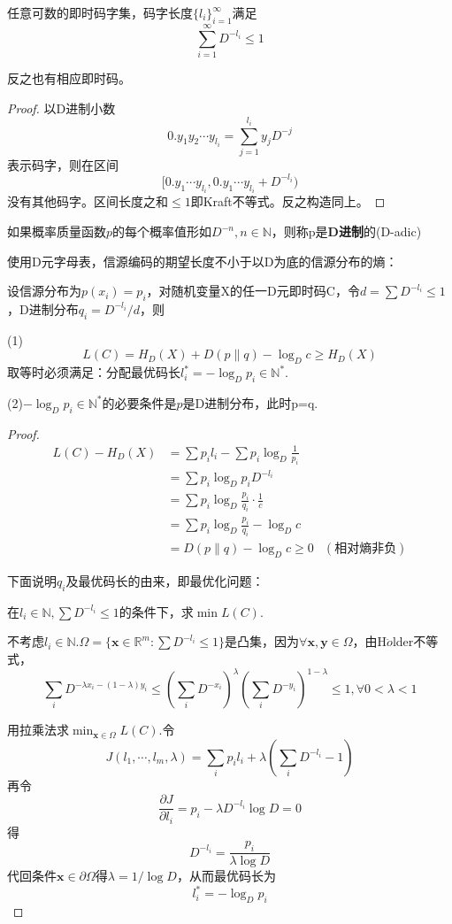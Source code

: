 \documentclass{ctexbook}
\begin{document}
\begin{theorem}[推广的Kraft不等式]
    任意可数的即时码字集，码字长度$\{l_i\}_{i=1}^{\infty}$满足
    \[\sum_{i=1}^{\infty}D^{-l_i}\leq 1\]

    反之也有相应即时码。
\end{theorem}
\begin{proof}
    以D进制小数
    \[0.y_1 y_2 \cdots y_{l_i}=\sum_{j=1}^{l_i}y_j D^{-j}\]
    表示码字，则在区间
    \[[0.y_1\cdots y_{l_i},0.y_1\cdots y_{l_i}+D^{-l_i})\]
    没有其他码字。区间长度之和$\leq 1$即Kraft不等式。反之构造同上。
\end{proof}

\begin{definition}[D进制概率分布]
    如果概率质量函数$p$的每个概率值形如$D^{-n},n\in\mathbb{N}$，则称p是\textbf{D进制}的(D-adic)
\end{definition}

使用D元字母表，信源编码的期望长度不小于以D为底的信源分布的熵：

\begin{theorem}[期望长度的估计]
    设信源分布为$p(x_i)=p_i$，对随机变量X的任一D元即时码C，令$d=\sum D^{-l_i}\leq1$，D进制分布$q_i=D^{-l_i}/d$，则

    (1)\[L(C)=H_D(X)+D(p\|q)-\log_D c\geq H_D(X)\]
    取等时必须满足：分配最优码长$l_i^*=-\log_D p_i\in\mathbb{N} ^*$.

    (2)$-\log_D p_i\in\mathbb{N} ^*$的必要条件是$p$是D进制分布，此时p=q.
\end{theorem}
\begin{proof}
    \begin{align*}
        L(C)-H_D(X)&=\sum p_i l_i-\sum p_i \log_D\frac{1}{p_i}\\
        &=\sum p_i \log_D p_iD^{-l_i}\\
        &=\sum p_i \log_D \frac{p_i}{q_i}\cdot\frac{1}{c}\\
        &=\sum p_i\log_D\frac{p_i}{q_i}-\log_D c\\
        &=D(p\|q)-\log_D c\geq 0&(\text{相对熵非负})
    \end{align*}

    下面说明$q_i$及最优码长的由来，即最优化问题：
    
    在$l_i\in\mathbb{N} ,\sum D^{-l_i}\leq 1$的条件下，求$\min L(C)$.

    不考虑$l_i\in\mathbb{N}$.$\Omega=\{\mathbf{x}\in\mathbb{R}^m:\sum D^{-l_i}\leq 1\}$是凸集，因为$\forall \mathbf{x},\mathbf{y}\in\Omega$，由H$\ddot{o}$lder不等式，
    \[\sum_i D^{-\lambda x_i-(1-\lambda)y_i}\leq \left(\sum_i D^{-x_i}\right)^{\lambda}\left(\sum_i D^{-y_i}\right)^{1-\lambda}\leq 1,\forall 0<\lambda<1\]

    用拉乘法求$\min_{\mathbf{x}\in\Omega}L(C)$.令
    \[J(l_1,\cdots,l_m,\lambda)=\sum_i p_i l_i+\lambda\left(\sum_i D^{-l_i}-1\right)\]
    再令
    \[\frac{\partial J}{\partial l_i}=p_i-\lambda D^{-l_i}\log D=0\]
    得
    \[D^{-l_i}=\frac{p_i}{\lambda\log D}\]
    代回条件$\mathbf{x}\in\partial \Omega$得$\lambda=1/\log D$，从而最优码长为
    \[l^*_i=-\log_D p_i\]
\end{proof}
\end{document}
